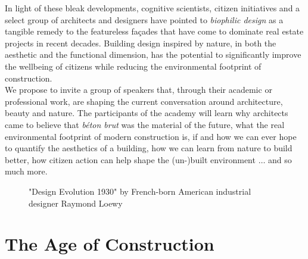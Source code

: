 \documentclass{article}
\begin{document}
\begin{minipage}{0.625\textwidth}
In light of these bleak developments, cognitive scientists, citizen initiatives and a select group of architects and designers have pointed to \textit{biophilic design} as a tangible remedy to the featureless façades that have come to dominate real estate projects in recent decades. Building design inspired by nature, in both the aesthetic and the functional dimension, has the potential to significantly improve the wellbeing of citizens while reducing the environmental footprint of construction. \\

We propose to invite a group of speakers that, through their academic or professional work, are shaping the current conversation around architecture, beauty and nature. The participants of the academy will learn why architects came to believe that \textit{béton brut} was the material of the future, what the real environmental footprint of modern construction is, if and how we can ever hope to quantify the aesthetics of a building, how we can learn from nature to build better, how citizen action can help shape the (un-)built environment $\dots$ and so much more.

\end{minipage}\hspace{15mm}
\begin{minipage}{0.325\textwidth}
    \begin{figure}[H]
        \centering
        \caption{
            "Design Evolution 1930" by French-born American industrial designer Raymond Loewy \cite{loewy_industrial_1979}
        }
        \label{fig:loewy}
    \end{figure}
\end{minipage}

\clearpage
\section{The Age of Construction}
\label{sec:construction}
\end{document}
